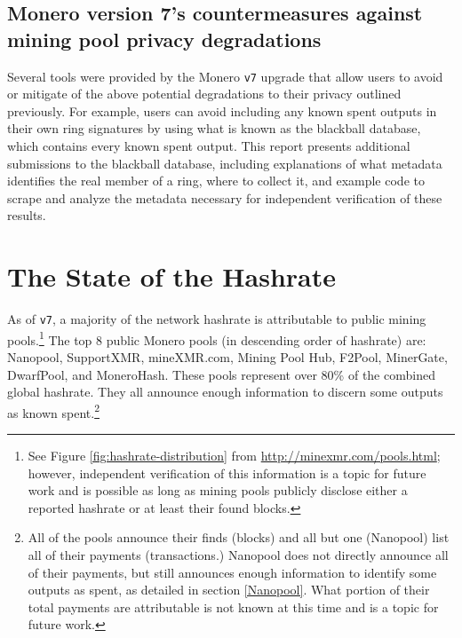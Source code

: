 \documentclass[notitlepage]{report}
\begin{document}
\subsection{Monero version 7's countermeasures against mining pool privacy degradations}

Several tools were provided by the Monero \verb/v7/ upgrade that allow users to avoid or mitigate of the above potential degradations to their privacy outlined previously.  For example, users can avoid including any known spent outputs in their own ring signatures by using what is known as the blackball database, which contains every known spent output.  This report presents additional submissions to the blackball database, including explanations of what metadata identifies the real member of a ring, where to collect it, and example code to scrape and analyze the metadata necessary for independent verification of these results.

\section{The State of the Hashrate}
\setcounter{chapter}{2}

As of \verb/v7/, a majority of the network hashrate is attributable to public mining pools.\footnote{See Figure \ref{fig:hashrate-distribution} from \url{http://minexmr.com/pools.html}; however, independent verification of this information is a topic for future work and is possible as long as mining pools publicly disclose either a reported hashrate or at least their found blocks.}  The top 8 public Monero pools (in descending order of hashrate) are: Nanopool, SupportXMR, mineXMR.com, Mining Pool Hub, F2Pool, MinerGate, DwarfPool, and MoneroHash.  These pools represent over 80\% of the combined global hashrate.  They all announce enough information to discern some outputs as known spent.\footnote{All of the pools announce their finds (blocks) and all but one (Nanopool) list all of their payments (transactions.)  Nanopool does not directly announce all of their payments, but still announces enough information to identify some outputs as spent, as detailed in section \ref{Nanopool}.  What portion of their total payments are attributable is not known at this time and is a topic for future work.}
\end{document}
